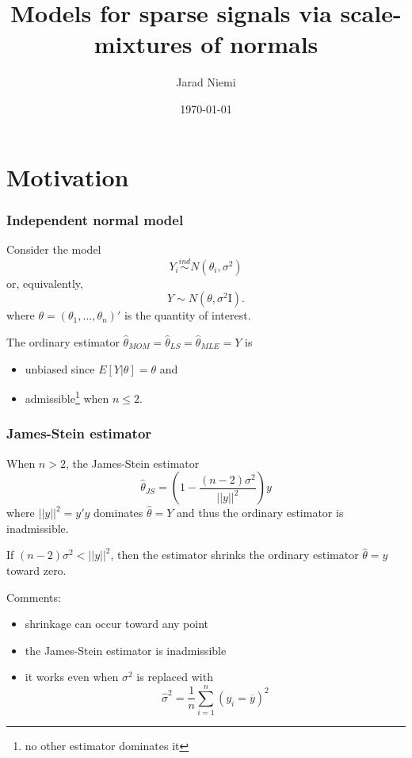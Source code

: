 \documentclass[handout]{beamer}
\title[Sparse signals]{Models for sparse signals via scale-mixtures of normals}
\author{Jarad Niemi}
\institute[Iowa State]{Iowa State University}
\date{\today}
\newcommand{\I}{\mathrm{I}}
\begin{document}
\begin{frame}
\maketitle
\end{frame}


\section{Motivation}
\begin{frame}
\frametitle{Independent normal model}
Consider the model 
\[ Y_i \stackrel{ind}{\sim} N(\theta_i,\sigma^2) \]
\pause or, equivalently,
\[ Y \sim N(\theta, \sigma^2\I). \]
where $\theta = (\theta_1,\ldots,\theta_n)'$ is the quantity of interest.

\vspace{0.2in} \pause

The ordinary estimator $\hat{\theta}_{MOM} = \hat{\theta}_{LS} = \hat{\theta}_{MLE} = Y$ \pause is

\begin{itemize}
\item \alert{unbiased} since $E[Y|\theta]=\theta$ \pause and 
\item \alert{admissible}\footnote{no other estimator \alert{dominates} it} when $n\le 2$.
\end{itemize}
\end{frame}


\begin{frame}
\frametitle{James-Stein estimator}
\small
When $n>2$, the James-Stein estimator 
\[ \hat{\theta}_{JS} = \left( 1-\frac{(n-2)\sigma^2}{||y||^2}\right)y \]
where $||y||^2=y'y$ \pause \alert{dominates} $\hat{\theta}=Y$ and thus the ordinary estimator is inadmissible.

\vspace{0.2in} \pause

If $(n-2)\sigma^2 < ||y||^2$, then the estimator shrinks the ordinary estimator $\hat{\theta}=y$ toward zero.

\vspace{0.2in} \pause 

Comments:
\begin{itemize}[<+->]
\item shrinkage can occur toward any point
\item the James-Stein estimator is inadmissible
\item it works even when $\sigma^2$ is replaced with 
\[ \hat{\sigma}^2 = \frac{1}{n}\sum_{i=1}^n (y_i=\overline{y})^2 \]
\end{itemize}
\end{frame}
  
\end{document}
